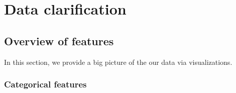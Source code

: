 %
%   
\clearpage
\section{Data clarification}
\label{section:data_clarify}








\subsection{Overview of features}

In this section, we provide a big picture of the our data via visualizations.

\subsubsection{Categorical features}

